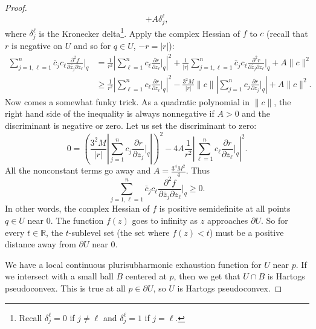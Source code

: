 \documentclass[12pt,openany]{book}
\newcommand{\sabs}[1]{\lvert {#1} \rvert}
\newcommand{\snorm}[1]{\lVert {#1} \rVert}
\newcommand{\abs}[1]{\left\lvert {#1} \right\rvert}
\newcommand{\R}{{\mathbb{R}}}
\theoremstyle{plain}
\theoremstyle{remark}
\theoremstyle{definition}
\theoremstyle{exercise}
\theoremstyle{example}
\begin{document}
\begin{proof}
\begin{equation*}
+
A\delta_{j}^{\ell} ,
\end{equation*}
where $\delta_j^\ell$ is the Kronecker delta\footnote{%
Recall $\delta_j^\ell = 0$ if $j\not= \ell$ and $\delta_j^\ell = 1$ if $j =
\ell$.}.
Apply the complex Hessian of $f$ to $c$ (recall that $r$ is negative
on $U$ and so for $q \in U$, $-r = \sabs{r}$):
\begin{equation*}
\begin{split}
\sum_{j=1,\ell=1}^n
\bar{c}_j c_\ell \frac{\partial^2 f}{\partial \bar{z}_j \partial z_\ell} \Big|_q 
& =
\frac{1}{r^2}
\abs{
\sum_{\ell=1}^n
c_\ell
\frac{\partial r}{\partial z_\ell} \Big|_q
}^2
+
\frac{1}{\sabs{r}}
\sum_{j=1,\ell=1}^n
\bar{c}_j
c_\ell
\frac{\partial^2 r}{\partial \bar{z}_j \partial z_\ell} \Big|_q
+
A \snorm{c}^2
\\
& \geq
\frac{1}{r^2}
\abs{
\sum_{\ell=1}^n
c_\ell
\frac{\partial r}{\partial z_\ell} \Big|_q
}^2
-
\frac{3^2 M}{\sabs{r}}
\snorm{c}\abs{\sum_{j=1}^n c_j \frac{\partial r}{\partial z_j} \Big|_q} 
+
A \snorm{c}^2 .
\end{split}
\end{equation*}
Now comes a somewhat funky trick.
As a quadratic polynomial in $\snorm{c}$, the right hand side of the
inequality
is always nonnegative if $A > 0$ and the discriminant is negative or zero.
Let us set the discriminant to zero:
\begin{equation*}
0 = 
{\left(
\frac{3^2 M}{\sabs{r}}
\abs{\sum_{j=1}^n c_j \frac{\partial r}{\partial z_j} \Big|_q}
\right)}^2
- 4A 
\frac{1}{r^2}
\abs{
\sum_{\ell=1}^n
c_\ell
\frac{\partial r}{\partial z_\ell} \Big|_q
}^2 .
\end{equation*}
All the nonconstant terms go away and 
$A=\frac{3^4 M^2}{4}$.  Thus
\begin{equation*}
\sum_{j=1,\ell=1}^n
\bar{c}_j c_\ell \frac{\partial^2 f}{\partial \bar{z}_j \partial z_\ell} \Big|_q 
\geq 0.
\end{equation*}
In other words, the complex Hessian
of $f$ is positive semidefinite at all points $q \in U$ near $0$.
The function $f(z)$ goes to infinity as $z$ approaches $\partial U$.
So for every $t \in \R$, the $t$-sublevel set
(the set where $f(z) < t$) must be a positive
distance away from $\partial U$ near $0$.

We have a local continuous plurisubharmonic
exhaustion function for $U$ near $p$.  If we intersect
with a small ball $B$ centered at $p$, then we get that $U \cap B$ is
Hartogs pseudoconvex.  This is true at all
$p \in \partial U$, so $U$ is Hartogs pseudoconvex.
\end{proof}
\end{document}
